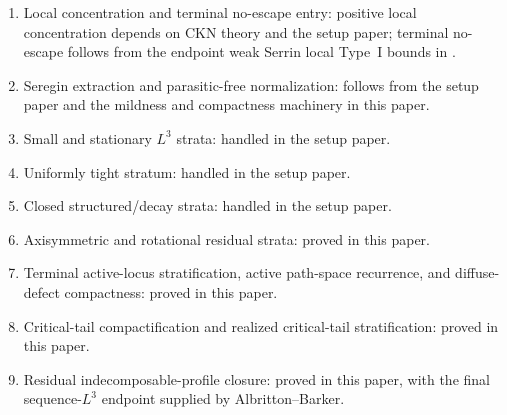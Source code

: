 \documentclass[11pt]{amsart}
\numberwithin{equation}{section}
\theoremstyle{plain}
\theoremstyle{definition}
\theoremstyle{remark}
\begin{document}
\begin{enumerate}[label=\textup{(\arabic*)},leftmargin=2.2em]
   \item Local concentration and terminal no-escape entry: positive local
   concentration depends on CKN theory and the setup paper; terminal no-escape follows
   from the endpoint weak Serrin local Type~I bounds in
   .
   \item Seregin extraction and parasitic-free normalization: follows from
   the setup paper and the mildness and compactness machinery in this paper.
   \item Small and stationary \(L^3\) strata: handled in the setup paper.
   \item Uniformly tight stratum: handled in the setup paper.
   \item Closed structured/decay strata: handled in the setup paper.
   \item Axisymmetric and rotational residual strata: proved in this paper.
   \item Terminal active-locus stratification, active path-space recurrence, and
   diffuse-defect compactness: proved in this paper.
   \item Critical-tail compactification and realized critical-tail
   stratification: proved in this paper.
   \item Residual indecomposable-profile closure: proved in this paper, with
   the final sequence-\(L^3\) endpoint supplied by Albritton--Barker.
\end{enumerate}
\end{document}
